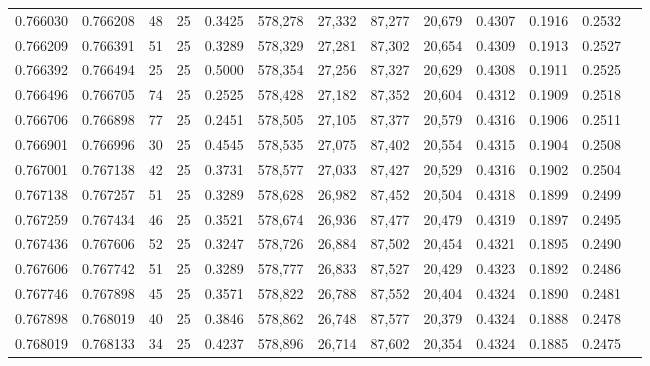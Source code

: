 \begin{tabular}{rrrrrrrrrrrrr}
0.766030 & 0.766208 &    48 &  25 &                                     0.3425 & 578,278 &  27,332 &  87,277 &  20,679 & 0.4307 & 0.1916 & 0.2532 \\
0.766209 & 0.766391 &    51 &  25 &                                     0.3289 & 578,329 &  27,281 &  87,302 &  20,654 & 0.4309 & 0.1913 & 0.2527 \\
0.766392 & 0.766494 &    25 &  25 &                                     0.5000 & 578,354 &  27,256 &  87,327 &  20,629 & 0.4308 & 0.1911 & 0.2525 \\
0.766496 & 0.766705 &    74 &  25 &                                     0.2525 & 578,428 &  27,182 &  87,352 &  20,604 & 0.4312 & 0.1909 & 0.2518 \\
0.766706 & 0.766898 &    77 &  25 &                                     0.2451 & 578,505 &  27,105 &  87,377 &  20,579 & 0.4316 & 0.1906 & 0.2511 \\
0.766901 & 0.766996 &    30 &  25 &                                     0.4545 & 578,535 &  27,075 &  87,402 &  20,554 & 0.4315 & 0.1904 & 0.2508 \\
0.767001 & 0.767138 &    42 &  25 &                                     0.3731 & 578,577 &  27,033 &  87,427 &  20,529 & 0.4316 & 0.1902 & 0.2504 \\
0.767138 & 0.767257 &    51 &  25 &                                     0.3289 & 578,628 &  26,982 &  87,452 &  20,504 & 0.4318 & 0.1899 & 0.2499 \\
0.767259 & 0.767434 &    46 &  25 &                                     0.3521 & 578,674 &  26,936 &  87,477 &  20,479 & 0.4319 & 0.1897 & 0.2495 \\
0.767436 & 0.767606 &    52 &  25 &                                     0.3247 & 578,726 &  26,884 &  87,502 &  20,454 & 0.4321 & 0.1895 & 0.2490 \\
0.767606 & 0.767742 &    51 &  25 &                                     0.3289 & 578,777 &  26,833 &  87,527 &  20,429 & 0.4323 & 0.1892 & 0.2486 \\
0.767746 & 0.767898 &    45 &  25 &                                     0.3571 & 578,822 &  26,788 &  87,552 &  20,404 & 0.4324 & 0.1890 & 0.2481 \\
0.767898 & 0.768019 &    40 &  25 &                                     0.3846 & 578,862 &  26,748 &  87,577 &  20,379 & 0.4324 & 0.1888 & 0.2478 \\
0.768019 & 0.768133 &    34 &  25 &                                     0.4237 & 578,896 &  26,714 &  87,602 &  20,354 & 0.4324 & 0.1885 & 0.2475 \\

\end{tabular}
